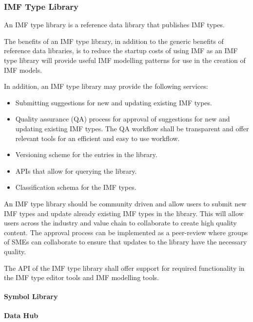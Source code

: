 \subsubsection{IMF Type Library}

An IMF type library is a reference data library that publishes IMF types.

The benefits of an IMF type library, in addition to the generic benefits of reference data libraries, is to reduce the startup costs of using IMF as an IMF type library will provide useful IMF modelling patterns for use in the creation of IMF models.

In addition, an IMF type library may provide the following services:

\begin{itemize}
\item Submitting suggestions for new and updating existing IMF types.
\item Quality assurance (QA) process for approval of suggestions for
  new and updating existing IMF types. The QA workflow shall be
  transparent and offer relevant tools for an efficient and easy to
  use workflow.
\item Versioning scheme for the entries in the library.
\item APIs that allow for querying the library.
\item Classification schema for the IMF types.
\end{itemize}
  
An IMF type library should be community driven and allow users to submit new IMF types and update already
existing IMF types in the library. This will allow users across the industry and value chain to collaborate to create
high quality content. The approval process can be implemented as a peer-review where groups of SMEs can collaborate
to ensure that updates to the library have the necessary quality.

The API of the IMF type library shall offer support for required functionality in
the IMF type editor tools and IMF modelling tools.


\paragraph{Symbol Library}
\label{sec:symbol-library}

\paragraph{Data Hub}


